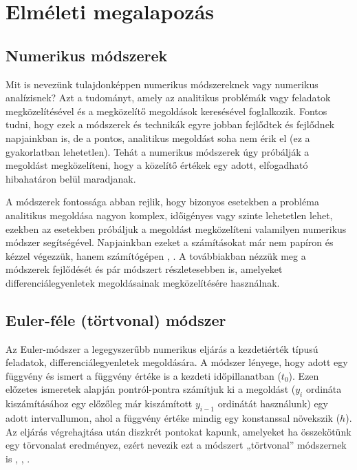 \chapter{Elméleti megalapozás}

\section {Numerikus módszerek}

Mit is nevezünk tulajdonképpen numerikus módszereknek vagy numerikus analízisnek? Azt a tudományt, amely az analitikus problémák vagy feladatok megközelítésével és a megközelítő megoldások keresésével foglalkozik. Fontos tudni, hogy ezek a módszerek és technikák egyre jobban fejlődtek és fejlődnek napjainkban is, de a pontos, analitikus megoldást soha nem érik el (ez a gyakorlatban lehetetlen). Tehát a numerikus módszerek úgy próbálják a megoldást megközelíteni, hogy a közelítő értékek egy adott, elfogadható hibahatáron belül maradjanak.

A módszerek fontossága abban rejlik, hogy bizonyos esetekben a probléma analitikus megoldása nagyon komplex, időigényes vagy szinte lehetetlen lehet, ezekben az esetekben próbáljuk a megoldást megközelíteni valamilyen numerikus módszer segítségével. Napjainkban ezeket a számításokat már nem papíron és kézzel végezzük, hanem számítógépen \cite{DiffEgyenletesKonyv}, \cite{DavidLoganBook}. A továbbiakban nézzük meg a módszerek fejlődését és pár módszert részletesebben is, amelyeket differenciálegyenletek megoldásainak megközelítésére használnak.

\section {Euler-féle (törtvonal) módszer}

Az Euler-módszer a legegyszerűbb numerikus eljárás a kezdetiérték típusú feladatok, differenciálegyenletek megoldására. A módszer lényege, hogy adott egy függvény és ismert a függvény értéke is a kezdeti időpillanatban ($t_{0}$). Ezen előzetes ismeretek alapján pontról-pontra számítjuk ki a megoldást ($y_{i}$ ordináta kiszámításához egy előzőleg már kiszámított $y_{i-1}$ ordinátát használunk) egy adott \newline [$t_{0}$, $t_{f}$] intervallumon, ahol a függvény értéke mindig egy konstanssal növekszik ($ h $). Az eljárás végrehajtása után diszkrét pontokat kapunk, amelyeket ha összekötünk egy törvonalat eredményez, ezért nevezik ezt a módszert „törtvonal” módszernek is \cite{KupanPalJegyzet}, \cite{DiffEgyenletesKonyv}, \cite{Diplomadolgozat}.

